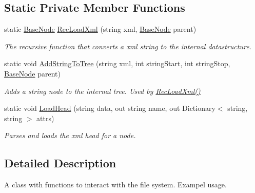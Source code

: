\subsection*{Static Private Member Functions}
\begin{DoxyCompactItemize}
\item 
static \hyperlink{class_x_m_leru_handleru_1_1_base_node}{Base\+Node} \hyperlink{class_x_m_leru_handleru_1_1_x_m_l_file_manager_ab2319255e299a848a93e5b464615ecae}{Rec\+Load\+Xml} (string xml, \hyperlink{class_x_m_leru_handleru_1_1_base_node}{Base\+Node} parent)
\begin{DoxyCompactList}\small\item\em The recursive function that converts a xml string to the internal datastructure. \end{DoxyCompactList}\item 
static void \hyperlink{class_x_m_leru_handleru_1_1_x_m_l_file_manager_adb410d025ea3a465f050996541bb9d1c}{Add\+String\+To\+Tree} (string xml, int string\+Start, int string\+Stop, \hyperlink{class_x_m_leru_handleru_1_1_base_node}{Base\+Node} parent)
\begin{DoxyCompactList}\small\item\em Adds a string node to the internal tree. Used by \hyperlink{class_x_m_leru_handleru_1_1_x_m_l_file_manager_ab2319255e299a848a93e5b464615ecae}{Rec\+Load\+Xml()} \end{DoxyCompactList}\item 
static void \hyperlink{class_x_m_leru_handleru_1_1_x_m_l_file_manager_aecd66054ac6671e6723bd437fa5a73b1}{Load\+Head} (string data, out string name, out Dictionary$<$ string, string $>$ attrs)
\begin{DoxyCompactList}\small\item\em Parses and loads the xml head for a node. \end{DoxyCompactList}\end{DoxyCompactItemize}


\subsection{Detailed Description}
A class with functions to interact with the file system. Exampel usage. 


